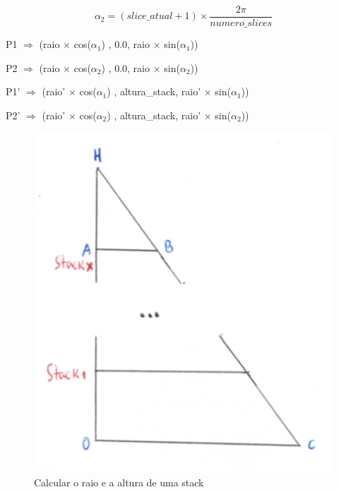 \documentclass[a4paper]{article}
\begin{document}
$$\alpha_{2} = (slice\_atual+1) \times \frac{2\pi}{numero\_slices} $$

\vspace{0.5cm}

        \hspace{1.5cm} P1 $\Rightarrow$ (raio $\times$ cos($\alpha_{1}$) , 0.0, raio $\times$ sin($\alpha_{1}$))

\vspace{0.2cm}

        \hspace{1.5cm} P2 $\Rightarrow$ (raio $\times$ cos($\alpha_{2}$) , 0.0, raio $\times$ sin($\alpha_{2}$))

\vspace{0.2cm}

        \hspace{0.5cm} P1' $\Rightarrow$ (raio' $\times$ cos($\alpha_{1}$) , altura\_stack, raio' $\times$ sin($\alpha_{1}$))

\vspace{0.2cm}

        \hspace{0.5cm} P2' $\Rightarrow$ (raio' $\times$ cos($\alpha_{2}$) , altura\_stack, raio' $\times$ sin($\alpha_{2}$))

\rmfamily

\vspace{1cm}

\begin{figure}[H]
\centering
\includegraphics[scale=0.50]{cone_raio_altura.png}
\caption{Calcular o raio e a altura de uma stack}
\label{img:cone_raio_altura}
\end{figure}
\end{document}

